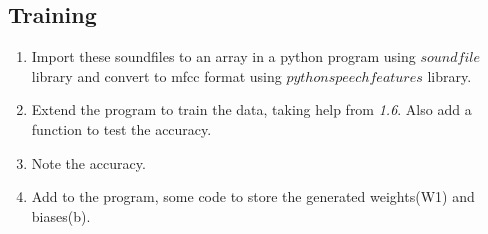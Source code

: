 \documentclass[journal,12pt,twocolumn]{IEEEtran}
\renewcommand\thesection{\arabic{section}}
\renewcommand\thesubsection{\thesection.\arabic{subsection}}
\begin{document}
\subsection{Training}
\begin{enumerate}[label=\thesubsection.\arabic*
,ref=\thesection.\theenumi]
\item Import these soundfiles to an array in a python program using $soundfile$ library and convert to mfcc format using $python speech features$ library. 
\item Extend the program to train the data, taking help from \textit{1.6}. Also add a function to test the accuracy.
\item Note the accuracy.
\item Add to the program, some code to store the generated weights(W1) and biases(b). 
\end{enumerate}


\end{document}
